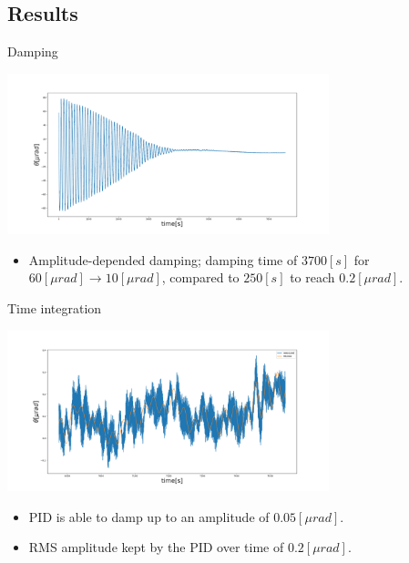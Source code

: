 \documentclass{beamer}
\begin{document}
\subsection{Results}
\begin{frame}{Damping}
	\begin{center}		
		\includegraphics[width=0.7\textwidth,keepaspectratio]{measured oscillation angle.png}
	\end{center}
	\begin{itemize}	
		
		\item Amplitude-depended damping; damping time of $3700[s]$ for $ 60 [\mu rad] \rightarrow 10[\mu rad] $, compared to $250[s]$ to reach $ 0.2[\mu rad]$.
						
	\end{itemize}
\end{frame}
\begin{frame}{Time integration}
	\begin{center}		
		\includegraphics[width=0.7\textwidth,keepaspectratio]{measured oscillation angle1.png}
	\end{center}
	\begin{itemize}	
		\item PID is able to damp up to an amplitude of $0.05[\mu rad]$.
		\item RMS amplitude kept by the PID over time of $ 0.2 [\mu rad]$.	
		
						
	\end{itemize}
\end{frame}
\end{document}

